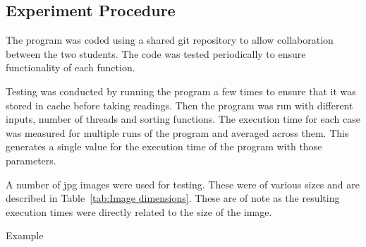 \subsection{Experiment Procedure}
The program was coded using a shared git repository to allow collaboration between the two students. The code was tested periodically to ensure functionality of each function.

Testing was conducted by running the program a few times to ensure that it was stored in cache before taking readings. Then the program was run with different inputs, number of threads and sorting functions. The execution time for each case was measured for multiple runs of the program and averaged across them. This generates a single value for the execution time of the program with those parameters.

A number of jpg images were used for testing. These were of various sizes and are described in Table~\ref{tab:Image dimensions}. These are of note as the resulting execution times were directly related to the size of the image.

{Example}

